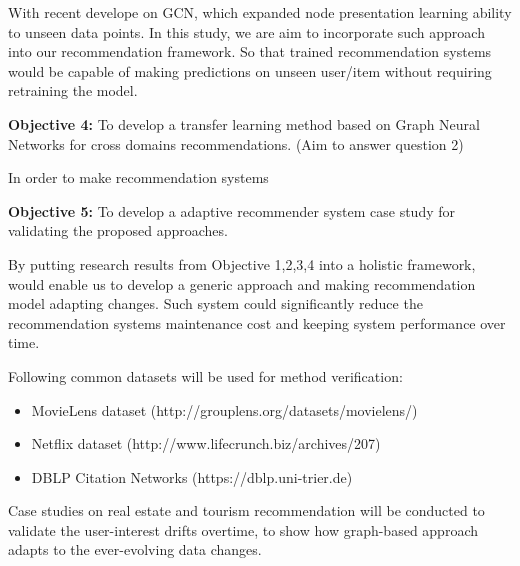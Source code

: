 With recent develope on GCN, which expanded node presentation learning ability to unseen data points. In this study, we are aim to incorporate such approach into our recommendation framework. So that trained recommendation systems would be capable of making predictions on unseen user/item without requiring retraining the model.

\bigskip
\textbf{Objective 4:} To develop a transfer learning method based on Graph Neural Networks for cross domains recommendations. (Aim to answer question 2)

In order to make recommendation systems


\bigskip
\textbf{Objective 5:} To develop a adaptive recommender system case study for validating the proposed approaches.

By putting research results from Objective 1,2,3,4 into a holistic framework, would enable us to develop a generic approach and making recommendation model adapting changes. Such system could significantly reduce the recommendation systems maintenance cost and keeping system performance over time. 

Following common datasets will be used for method verification: 

\begin{itemize}

\item MovieLens dataset (http://grouplens.org/datasets/movielens/) 

\item Netflix dataset (http://www.lifecrunch.biz/archives/207) 

\item DBLP Citation Networks (https://dblp.uni-trier.de)  

\end{itemize}

Case studies on real estate and tourism recommendation will be conducted to validate the user-interest drifts overtime, to show how graph-based approach adapts to the ever-evolving data changes. 
